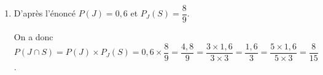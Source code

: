 
\medskip

%
%
%
%
%
%

\medskip

\begin{enumerate}
	\item %
	
D'après l'énoncé $P(J) = 0,6$ et $P_J(S) = \dfrac89$.

On a donc $P(J \cap S) = P(J) \times P_J(S) = 0,6 \times \dfrac89 = \dfrac{4,8}{9} = \dfrac{3 \times 1,6}{3 \times 3} = \dfrac{1,6}{3}  = \dfrac{5 \times 1,6}{5 \times 3}  = \dfrac{8}{15}$.
\end{enumerate}


